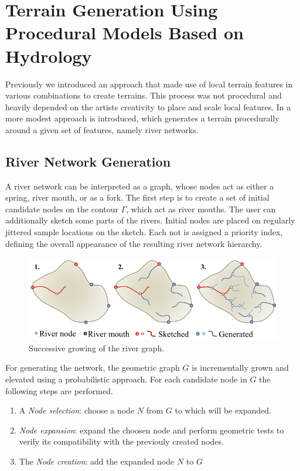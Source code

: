 \section{Terrain Generation Using Procedural Models Based on Hydrology}
Previously we introduced an approach that made use of local terrain features in various combinations to create terrains. This process was not procedural and heavily depended on the artists creativity to place and scale local features. In \cite{Genevaux:2013:TGU:2461912.2461996} a more modest approach is introduced, which generates a terrain procedurally around a given set of features, namely river networks.
 
\subsection{River Network Generation}
A river network can be interpreted as a graph, whose nodes act as either a spring, river mouth, or as a fork. 
The first step is to create a set of initial candidate nodes on the contour $\Gamma$, which act as river mouths. The user can additionally sketch some parts of the rivers. Initial nodes are placed on regularly jittered sample locations on the sketch. Each not is assigned a priority index, defining the overall appearance of the resulting river network hierarchy. 

\begin{figure}[htb]
	\centering
	\includegraphics[width=\linewidth]{GGG13/river_network_sketch}
	\caption{Successive growing of the river graph. }
	\label{fig:river_network_sketch}
\end{figure}

For generating the network, the geometric graph $G$ is incrementally grown and elevated using a probabilistic approach. For each candidate node in $G$ the following steps are performed. 
\begin{enumerate}
	\item A \textit{Node selection}: choose a node $N$ from $G$ to which will be expanded.
	\item \textit{Node expansion}: expand the choosen node and perform geometric tests to verify its compatibility with the previouly created nodes. 
	\item The \textit{Node creation}: add the expanded node $N$ to $G$ 
\end{enumerate}

